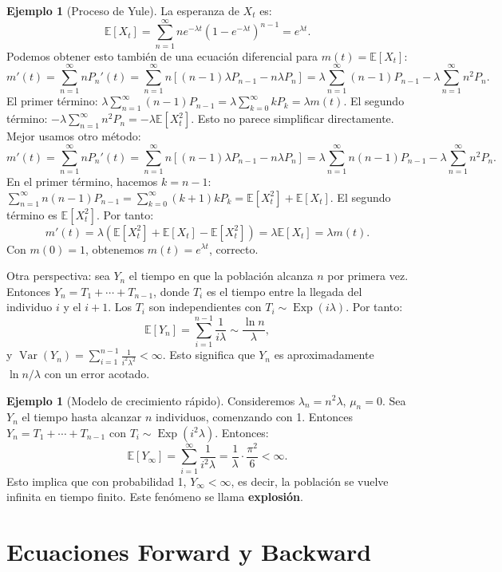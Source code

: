 \documentclass{article}
\theoremstyle{plain}
\theoremstyle{definition}
\newtheorem{Ejemplo}[Teorema]{Ejemplo}
\newcommand{\E}{\mathbb{E}}
\begin{document}
\begin{Ejemplo}[Proceso de Yule]
  La esperanza de $X_t$ es:
  \[ \E[X_t] = \sum_{n=1}^\infty n e^{-\lambda t}(1 - e^{-\lambda t})^{n-1} = e^{\lambda t}. \]
  Podemos obtener esto tambi\'en de una ecuaci\'on diferencial para $m(t) = \E[X_t]$:
  \[ m'(t) = \sum_{n=1}^\infty n P_n'(t) = \sum_{n=1}^\infty n[(n-1)\lambda P_{n-1} - n\lambda P_n] = \lambda \sum_{n=1}^\infty (n-1)P_{n-1} - \lambda \sum_{n=1}^\infty n^2 P_n. \]
  El primer t\'ermino: $\lambda \sum_{n=1}^\infty (n-1)P_{n-1} = \lambda \sum_{k=0}^\infty k P_k = \lambda m(t)$. El segundo t\'ermino: $-\lambda \sum_{n=1}^\infty n^2 P_n = -\lambda \E[X_t^2]$. Esto no parece simplificar directamente. Mejor usamos otro m\'etodo:
  \[ m'(t) = \sum_{n=1}^\infty n P_n'(t) = \sum_{n=1}^\infty n[(n-1)\lambda P_{n-1} - n\lambda P_n] = \lambda \sum_{n=1}^\infty n(n-1)P_{n-1} - \lambda \sum_{n=1}^\infty n^2 P_n. \]
  En el primer t\'ermino, hacemos $k = n-1$: $\sum_{n=1}^\infty n(n-1)P_{n-1} = \sum_{k=0}^\infty (k+1)k P_k = \E[X_t^2] + \E[X_t]$. El segundo t\'ermino es $\E[X_t^2]$. Por tanto:
  \[ m'(t) = \lambda (\E[X_t^2] + \E[X_t] - \E[X_t^2]) = \lambda \E[X_t] = \lambda m(t). \]
  Con $m(0)=1$, obtenemos $m(t) = e^{\lambda t}$, correcto.
  
  Otra perspectiva: sea $Y_n$ el tiempo en que la poblaci\'on alcanza $n$ por primera vez. Entonces $Y_n = T_1 + \cdots + T_{n-1}$, donde $T_i$ es el tiempo entre la llegada del individuo $i$ y el $i+1$. Los $T_i$ son independientes con $T_i \sim \operatorname{Exp}(i\lambda)$. Por tanto:
  \[ \E[Y_n] = \sum_{i=1}^{n-1} \frac{1}{i\lambda} \sim \frac{\ln n}{\lambda}, \]
  y $\operatorname{Var}(Y_n) = \sum_{i=1}^{n-1} \frac{1}{i^2\lambda^2} < \infty$. Esto significa que $Y_n$ es aproximadamente $\ln n/\lambda$ con un error acotado.
\end{Ejemplo}

\begin{Ejemplo}[Modelo de crecimiento r\'apido]
  Consideremos $\lambda_n = n^2\lambda$, $\mu_n = 0$. Sea $Y_n$ el tiempo hasta alcanzar $n$ individuos, comenzando con 1. Entonces $Y_n = T_1 + \cdots + T_{n-1}$ con $T_i \sim \operatorname{Exp}(i^2\lambda)$. Entonces:
  \[ \E[Y_\infty] = \sum_{i=1}^\infty \frac{1}{i^2\lambda} = \frac{1}{\lambda} \cdot \frac{\pi^2}{6} < \infty. \]
  Esto implica que con probabilidad 1, $Y_\infty < \infty$, es decir, la poblaci\'on se vuelve infinita en tiempo finito. Este fen\'omeno se llama \textbf{explosi\'on}.
\end{Ejemplo}

\section{Ecuaciones Forward y Backward}
\end{document}
